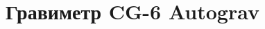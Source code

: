 \documentclass[10pt]{geodmanual}
\title{Гравиметр CG-6 Autograv\texttrademark{}}
\begin{document}
\newcommand{\cg}{CG-6 Autograv\texttrademark{}}

\maketitle
\tableofcontents








%
%
\end{document}
